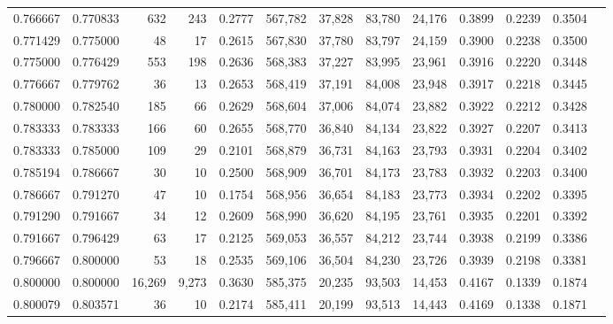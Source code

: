 \begin{tabular}{rrrrrrrrrrrrr}
0.766667 & 0.770833 &    632 &    243 &                                     0.2777 & 567,782 &  37,828 &  83,780 &  24,176 & 0.3899 & 0.2239 & 0.3504 \\
0.771429 & 0.775000 &     48 &     17 &                                     0.2615 & 567,830 &  37,780 &  83,797 &  24,159 & 0.3900 & 0.2238 & 0.3500 \\
0.775000 & 0.776429 &    553 &    198 &                                     0.2636 & 568,383 &  37,227 &  83,995 &  23,961 & 0.3916 & 0.2220 & 0.3448 \\
0.776667 & 0.779762 &     36 &     13 &                                     0.2653 & 568,419 &  37,191 &  84,008 &  23,948 & 0.3917 & 0.2218 & 0.3445 \\
0.780000 & 0.782540 &    185 &     66 &                                     0.2629 & 568,604 &  37,006 &  84,074 &  23,882 & 0.3922 & 0.2212 & 0.3428 \\
0.783333 & 0.783333 &    166 &     60 &                                     0.2655 & 568,770 &  36,840 &  84,134 &  23,822 & 0.3927 & 0.2207 & 0.3413 \\
0.783333 & 0.785000 &    109 &     29 &                                     0.2101 & 568,879 &  36,731 &  84,163 &  23,793 & 0.3931 & 0.2204 & 0.3402 \\
0.785194 & 0.786667 &     30 &     10 &                                     0.2500 & 568,909 &  36,701 &  84,173 &  23,783 & 0.3932 & 0.2203 & 0.3400 \\
0.786667 & 0.791270 &     47 &     10 &                                     0.1754 & 568,956 &  36,654 &  84,183 &  23,773 & 0.3934 & 0.2202 & 0.3395 \\
0.791290 & 0.791667 &     34 &     12 &                                     0.2609 & 568,990 &  36,620 &  84,195 &  23,761 & 0.3935 & 0.2201 & 0.3392 \\
0.791667 & 0.796429 &     63 &     17 &                                     0.2125 & 569,053 &  36,557 &  84,212 &  23,744 & 0.3938 & 0.2199 & 0.3386 \\
0.796667 & 0.800000 &     53 &     18 &                                     0.2535 & 569,106 &  36,504 &  84,230 &  23,726 & 0.3939 & 0.2198 & 0.3381 \\
0.800000 & 0.800000 & 16,269 &  9,273 &                                     0.3630 & 585,375 &  20,235 &  93,503 &  14,453 & 0.4167 & 0.1339 & 0.1874 \\
0.800079 & 0.803571 &     36 &     10 &                                     0.2174 & 585,411 &  20,199 &  93,513 &  14,443 & 0.4169 & 0.1338 & 0.1871 \\

\end{tabular}
